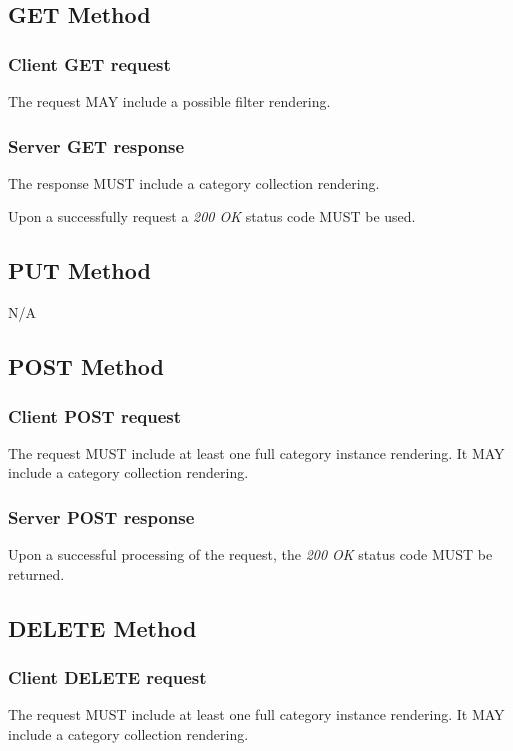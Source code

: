 \documentclass[10pt,a4paper]{article}
\begin{document}
\subsection{GET Method}

\subsubsection*{Client GET request}
The request MAY include a possible filter rendering.

\subsubsection*{Server GET response}
The response MUST include a category collection rendering.

Upon a successfully request a \emph{200 OK} status code MUST be used.

\subsection{PUT Method}

N/A

\subsection{POST Method}

\subsubsection*{Client POST request}
The request MUST include at least one full category instance rendering. It MAY include a category collection rendering.

\subsubsection*{Server POST response}
Upon a successful processing of the request, the \emph{200 OK} status code MUST be returned.

\subsection{DELETE Method}

\subsubsection*{Client DELETE request}
The request MUST include at least one full category instance rendering. It MAY include a category collection rendering.
\end{document}
